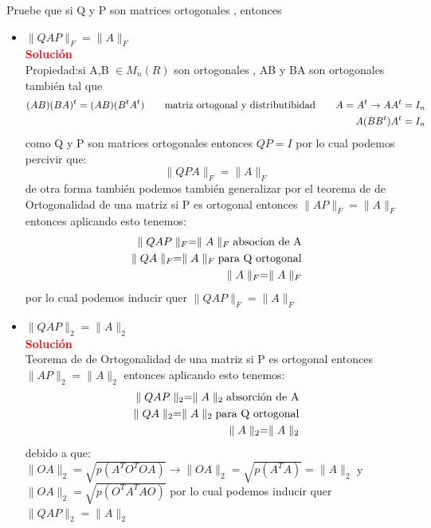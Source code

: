 \documentclass[12pt]{article}
\begin{document}
Pruebe que si Q y P son matrices ortogonales , entonces
\begin{itemize}
	\item $\parallel QAP \parallel_F = \parallel A\parallel_F$ \\ 
    \noindent \textcolor{red}{\bf Solución}\\
	Propiedad:si A,B $\in M_n(R)$ son ortogonales , AB y BA son ortogonales también tal que\\
	\begin{align*}
		(AB)(BA)^t= (AB)(B^tA^t) \qquad \textup{matriz ortogonal y distributibidad} \qquad A=A^t \rightarrow AA^t = I_n \\
		A(BB^t)A^t = I_n
	\end{align*}
	como Q y P son matrices ortogonales entonces $QP = I$ por lo cual podemos percivir que:
	$$\parallel QPA \parallel_F = \parallel A\parallel_F$$
	de otra forma también podemos también generalizar por el teorema de de Ortogonalidad de una matriz si P es ortogonal entonces  $\parallel AP \parallel_F = \parallel A\parallel_F$
	entonces aplicando esto tenemos:
	\begin{align*}
	\parallel QAP \parallel_F = \parallel A\parallel_F \textup{absocion de A} \\
	\parallel QA \parallel_F = \parallel A\parallel_F \textup{para Q ortogonal}\\
	\parallel A \parallel_F = \parallel A\parallel_F
	\end{align*}
	por lo cual podemos inducir quer $\parallel QAP \parallel_F = \parallel A\parallel_F$
	
	\item $\parallel QAP \parallel_2 = \parallel A\parallel_2$\\
    \noindent \textcolor{red}{\bf Solución}\\
	Teorema de de Ortogonalidad de una matriz si P es ortogonal entonces  $\parallel AP \parallel_2 = \parallel A\parallel_2$
	entonces aplicando esto tenemos:
	\begin{align*}
	\parallel QAP \parallel_2 = \parallel A\parallel_2 \textup{absorción de A} \\
	\parallel QA \parallel_2 = \parallel A\parallel_2 \textup{para Q ortogonal}\\
	\parallel A \parallel_2 = \parallel A\parallel_2
	\end{align*}
	debido a que: $	\parallel O A \parallel_2 = \sqrt{p(A^TO^T O A)} \rightarrow \parallel OA \parallel_2 =\sqrt{p(A^T A)} = \parallel A \parallel_2$ y $	\parallel OA \parallel_2 = \sqrt{p(O^TA^TAO)}$
	por lo cual podemos inducir quer $\parallel QAP \parallel_2 = \parallel A\parallel_2$
		
\end{itemize}
\end{document}
